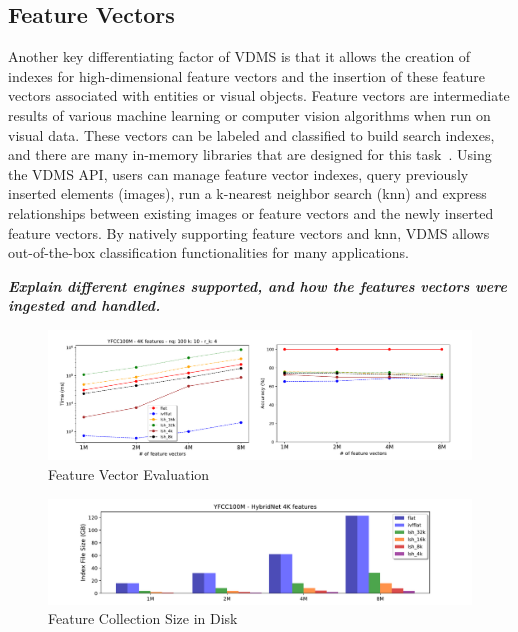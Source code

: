 \subsection{Feature Vectors}

Another key differentiating factor of VDMS is that it allows the creation of
indexes for high-dimensional feature vectors and the insertion of
these feature vectors associated with entities or visual objects.
Feature vectors are intermediate results of various machine
learning or computer vision algorithms when run on visual data.
These vectors can be labeled and classified to build search indexes,
and there are many in-memory libraries that are designed for
this task~\cite{flann, faiss}.
Using the VDMS API, users can manage feature vector indexes,
query previously inserted elements (images),
run a k-nearest neighbor search (knn) and express relationships
between existing images or feature vectors and
the newly inserted feature vectors.
By natively supporting feature vectors and knn,
VDMS allows out-of-the-box classification
functionalities for many applications.



\textbf{\textit{Explain different engines supported, and how the features vectors
were ingested and handled.}}

\begin{figure}[]
\centering
\includegraphics[width=\textwidth]{figures/features_alternatives}
\caption{Feature Vector Evaluation}
\label{fig:features_eval}
\end{figure}

\begin{figure}[]
\centering
\includegraphics[width=\textwidth]{figures/features_disksize}
\caption{Feature Collection Size in Disk}
\label{fig:features_size_does_matter}
\end{figure}
